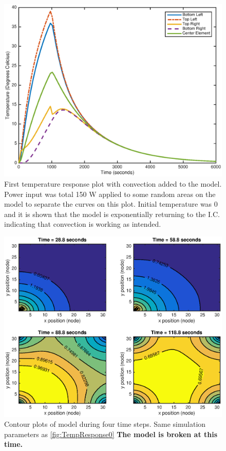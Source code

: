 \documentclass[10pt,twocolumn]{article}
\begin{document}
\begin{figure}
	\center
	\includegraphics[width=0.8\linewidth]{TmpRspnConvectionOct29,it0,pi150.eps}
	\caption{First temperature response plot with convection added to the model. Power input was total 150 W applied to some random areas on the model to separate the curves on this plot. Initial temperature was 0 and it is shown that the model is exponentially returning to the I.C. indicating that convection is working as intended.}
	\label{fig:TmpRspnConvectionOct29,it0,pi150}
\end{figure}


\begin{figure}
	\center
	\includegraphics[width=0.8\linewidth]{ContourTrans0.eps}
	\caption{Contour plots of model during four time steps. Same simulation parameters as \autoref{fig:TempResponse0} \textbf{The model is broken at this time.}}
	\label{fig:ContourTrans0}
\end{figure}
\end{document}
